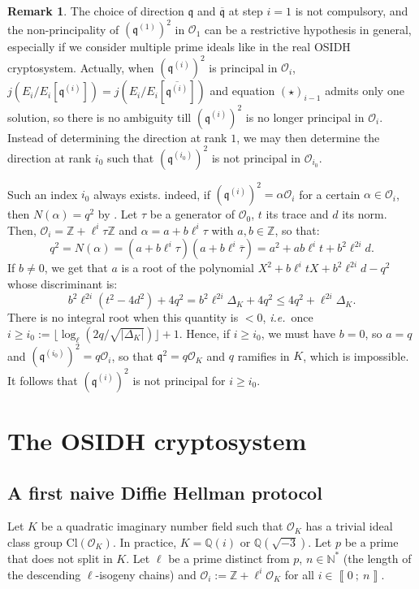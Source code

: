 \documentclass[a4paper,10pt]{report}
\theoremstyle{definition}
\theoremstyle{plain}
\theoremstyle{definition}
\newtheorem{Remark}[Definition]{Remark}
\newcommand{\ie}{\emph{i.e.}\ }
\newcommand{\N}{\mathbb{N}}
\newcommand{\Z}{\mathbb{Z}}
\newcommand{\Q}{\mathbb{Q}}
\newcommand{\mO}{\mathcal{O}}
\renewcommand{\i}[2]{\left\llbracket #1~;~#2\right\rrbracket}
\renewcommand{\(}{\left(}
\renewcommand{\)}{\right)}
\newcommand{\mfq}{\mathfrak{q}}
\begin{document}
\begin{Remark}
The choice of direction $\mfq$ and $\overline{\mfq}$ at step $i=1$ is not compulsory, and the non-principality of $(\mfq^{(1)})^2$ in $\mO_1$ can be a restrictive hypothesis in general, especially if we consider multiple prime ideals like in the real OSIDH cryptosystem. Actually, when $(\mfq^{(i)})^2$ is principal in $\mO_i$, $j(E_i/E_i[\mfq^{(i)}])=j(E_i/E_i[\overline{\mfq^{(i)}}])$ and equation $(\star)_{i-1}$ admits only one solution, so there is no ambiguity till $(\mfq^{(i)})^2$ is no longer principal in $\mO_i$. Instead of determining the direction at rank $1$, we may then determine the direction at rank $i_0$ such that $(\mfq^{(i_0)})^2$ is not principal in $\mO_{i_0}$. 

Such an index $i_0$ always exists.  indeed, if $(\mfq^{(i)})^2=\alpha\mO_i$ for a certain $\alpha\in\mO_i$, then $N(\alpha)=q^2$ by \cite[Lemma 7.14.(i)]{Cox}. Let $\tau$ be a generator of $\mO_0$, $t$ its trace and $d$ its norm. Then,  $\mO_i=\Z+\ell^i\tau\Z$ and $\alpha=a+b\ell^i\tau$ with $a, b\in\Z$, so that:
\[q^2=N(\alpha)=(a+b\ell^i\tau)(a+b\ell^i\overline{\tau})=a^2+ab\ell^it+b^2\ell^{2i}d.\]
If $b\neq 0$, we get that $a$ is a root of the polynomial $X^2+b\ell^itX+b^2\ell^{2i}d-q^2$ whose discriminant is:
\[b^2\ell^{2i}(t^2-4d^2)+4q^2=b^2\ell^{2i}\Delta_K+4q^2\leq 4q^2+\ell^{2i}\Delta_K.\]
There is no integral root when this quantity is $<0$, \ie once $i\geq i_0:=\lfloor \log_\ell(2q/\sqrt{|\Delta_K|})\rfloor +1$. Hence, if $i\geq i_0$, we must have $b=0$, so $a=q$ and $(\mfq^{(i_0)})^2=q\mO_i$, so that $\mfq^2=q\mO_K$ and $q$ ramifies in $K$, which is impossible. It follows that $(\mfq^{(i)})^2$ is not principal for $i\geq i_0$.
\end{Remark}


\chapter{The OSIDH cryptosystem}

\section{A first naive Diffie Hellman protocol}\label{paragraph 15}

Let $K$ be a quadratic imaginary number field such that $\mO_K$ has a trivial ideal class group $\mbox{Cl}(\mO_K)$. In practice, $K=\Q(i)$ or $\Q(\sqrt{-3})$. Let $p$ be a prime that does not split in $K$. Let $\ell$ be a prime distinct from $p$, $n\in\N^*$ (the length of the descending $\ell$-isogeny chains) and $\mO_i:=\Z+\ell^i\mO_K$ for all $i\in\i{0}{n}$.
\end{document}
